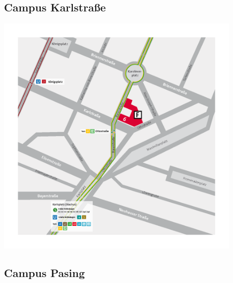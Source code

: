\subsection{Campus Karlstraße}
\includegraphics[width=12cm]{inputs/Lageplan/karlstr.png}


\subsection{Campus Pasing}

